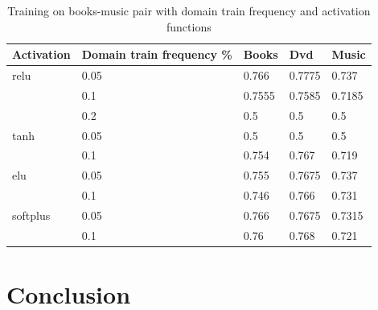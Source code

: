 \documentclass[11pt,a4paper]{article}
\begin{document}
\begin{table}[h]
\begin{center}
\begin{tabular}{|l|l|l|l|l|}
\hline Activation & Domain train frequency \% & Books & Dvd & Music \\ \hline
relu & 0.05 & 0.766 & 0.7775 & 0.737 \\
  & 0.1 & 0.7555 & 0.7585 & 0.7185 \\
  & 0.2 & 0.5 & 0.5 & 0.5 \\
\hline
tanh & 0.05 & 0.5 & 0.5 & 0.5  \\
  & 0.1 & 0.754 & 0.767 & 0.719 \\
\hline
elu & 0.05 & 0.755 & 0.7675 & 0.737 \\
  & 0.1 & 0.746 & 0.766 & 0.731 \\
\hline
softplus & 0.05 & 0.766 & 0.7675 & 0.7315 \\
  & 0.1 & 0.76 & 0.768 & 0.721 \\
\hline
\end{tabular}
\end{center}
\caption{ Training on books-music pair with domain train frequency and activation functions}
\label{dd-table}
\end{table}









\section{Conclusion}



%
%
\end{document}
